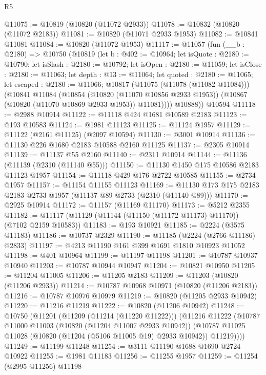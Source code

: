 \begin{lexlean}{R5}
\begin{coremodule}
@11075 := @10819 (@10820 (@11072 @2933))
@11078 := @10832 (@10820 (@11072 @2183))
@11081 := @10820 (@11071 @2933 @1953)
@11082 := @10841 @11081
@11084 := @10820 (@11072 @1953)
@11117 := @11057
    (fun (__b : @2180) =>
    @10750
      (@10819
        (let b : @402 := @10964;
        let isQuote : @2180 := @10790;
        let isSlash : @2180 := @10792;
        let isOpen : @2180 := @11059;
        let isClose : @2180 := @11063;
        let depth : @13 := @11064;
        let quoted : @2180 := @11065;
        let escaped : @2180 := @11066;
        @10817
          (@11075 (@11078 (@11082 @11084)))
          (@10841
            @11084
            (@10854
              (@10820 (@11070 @10856 @2933 @1953))
              (@10867 (@10820 (@11070 @10869 @2933 @1953)) @11081))))
        @10888))
    @10594
@11118 := @2988 @10914
@11122 := @11118 @424 @1681 @10589 @2183
@11123 := @193 @10583
@11124 := @1981 @11123
@11125 := @11124 @1957
@11129 := @11122 (@2161 @11125) (@2097 @10594)
@11130 := @3001 @10914
@11136 := @11130 @226 @1680 @2183 @10588 @2160 @11125
@11137 := @2305 @10914
@11139 := @11137 @55 @2160
@11140 := @2311 @10914
@11144 := @11136 (@11139 (@2310 (@11140 @55)))
@11150 := @11130 @1450 @175 @10586 @2183 @11123 @1957
@11154 := @11118 @429 @176 @2722 @10585
@11155 := @2734 @1957
@11157 := @11154 @11155 @11123
@11169 := @11130 @173 @175 @2183 @2183 @2733 @1957 (@11137 @89 @2733 (@2310 (@11140 @89)))
@11170 := @2925 @10914
@11172 := @11157 (@11169 @11170)
@11173 := @5212 @2355
@11182 := @11117 (@11129 (@11144 (@11150 (@11172 @11173) @11170)) (@7102 @2159 @10583))
@11183 := @193 @10921
@11185 := @2224 (@3575 @11183)
@11186 := @10737 @2329
@11190 := @11185 (@2224 (@2766 @11186) @2833)
@11197 := @4213 @11190 @161 @399 @1691 @1810 @10923 @11052
@11198 := @401 @10964
@11199 := @11197 @11198
@11201 := @10787 @10937 @10940
@11203 := @10787 @10944 @10947
@11204 := @10821 @10950
@11205 := @11204 @11005
@11206 := @11205 @2183
@11209 := @11203 (@10820 (@11206 @2933))
@11214 := @10787 @10968 @10971 (@10820 (@11206 @2183))
@11216 := @10787 @10976 @10979
@11219 := @10820 (@11205 @2933 @10942)
@11220 := @11216 @11219
@11222 := @10820 (@11206 @10942)
@11248 := @10750
    (@11201
      (@11209 (@11214 (@11220 @11222)))
      (@11216
        @11222
        (@10787
          @11000
          @11003
          (@10820 (@11204 @11007 @2933 @10942))
          (@10787 @11025 @11028 (@10820 (@11204 (@5106 @11005 @19) @2933 @10942)) @11219))))
@11249 := @11199 @11248
@11254 := @3111 @11190 @1688 @1690 @2724 @10922
@11255 := @1981 @11183
@11256 := @11255 @1957
@11259 := @11254 (@2995 @11256) @11198

\end{coremodule}
\end{lexlean}
